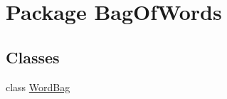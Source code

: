 \hypertarget{namespace_bag_of_words}{\section{Package Bag\-Of\-Words}
\label{namespace_bag_of_words}
}
\subsection*{Classes}
\begin{DoxyCompactItemize}
\item 
class \hyperlink{class_bag_of_words_1_1_word_bag}{Word\-Bag}
\end{DoxyCompactItemize}
